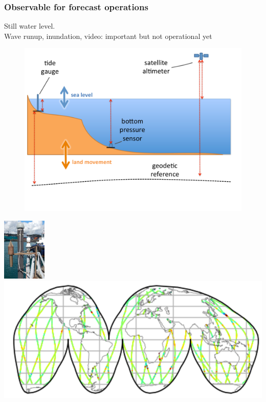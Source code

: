 \begin{frame}
\frametitle{Observable for forecast operations}
Still water level.\\
Wave runup, inundation, video: important but not operational yet
\begin{minipage}{0.6\textwidth}
    \begin{figure}      
    \includegraphics[width=\textwidth]{figures/diagrams/sealevel_cartoon.pdf}
    \end{figure}
\end{minipage}
\begin{minipage}{0.35\textwidth}
    \includegraphics[height=3cm]{figures/images/tidegaugeEg.png}
    \vspace{1cm}
    \includegraphics[width=\textwidth]{figures/maps/altimeterCoverageEg.png}
\end{minipage}

\end{frame}
